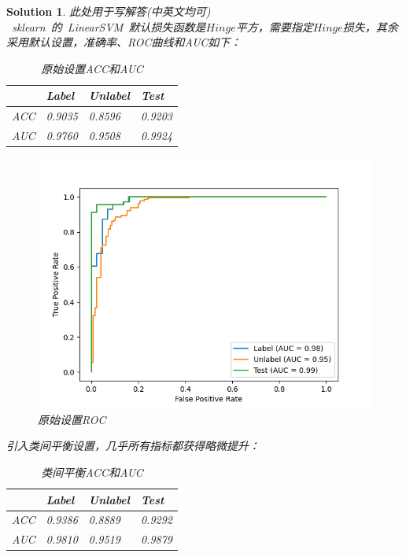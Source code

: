 \documentclass[a4paper,UTF8]{article}
\newtheorem*{solution}{Solution}
\numberwithin{equation}{section}
\begin{document}
\begin{solution}
此处用于写解答(中英文均可)\\
~sklearn~的~LinearSVM~默认损失函数是$Hinge$平方，需要指定$Hinge$损失，其余采用默认设置，准确率、ROC曲线和AUC如下：
\begin{table}[H]
    \centering
    \begin{tabular}{|l|l|l|l|}
        \hline
        ~   & Label  & Unlabel & Test   \\ 
        \hline
        ACC & 0.9035 & 0.8596  & 0.9203 \\ 
        \hline
        AUC & 0.9760 & 0.9508  & 0.9924 \\
        \hline
    \end{tabular}
    \caption{原始设置ACC和AUC}
\end{table}
\begin{figure}[H]
    \centering
    \includegraphics[scale=0.5]{Origin.png}
    \caption{原始设置ROC}
\end{figure}
引入类间平衡设置，几乎所有指标都获得略微提升：
\begin{table}[H]
    \centering
    \begin{tabular}{|l|l|l|l|}
        \hline
        ~   & Label  & Unlabel & Test   \\ 
        \hline
        ACC & 0.9386 & 0.8889  & 0.9292 \\ 
        \hline
        AUC & 0.9810 & 0.9519  & 0.9879 \\
        \hline
    \end{tabular}
    \caption{类间平衡ACC和AUC}
\end{table}

\end{solution}
\end{document}
